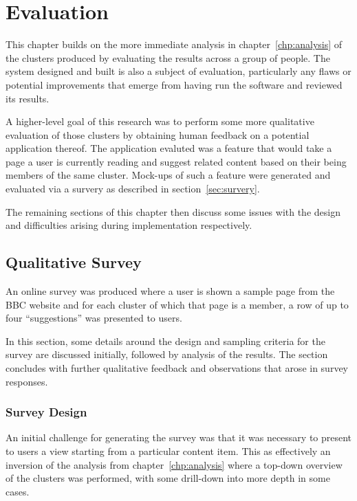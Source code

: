 \chapter{Evaluation}
\label{chp:evaluation}

This chapter builds on the more immediate analysis in
chapter~\ref{chp:analysis} of the clusters produced by evaluating the
results across a group of people. The system designed and built is
also a subject of evaluation, particularly any flaws or potential
improvements that emerge from having run the software and reviewed its
results.

A higher-level
goal of this research was to perform some more qualitative evaluation
of those clusters by obtaining human feedback on a potential
application thereof. The application evaluted was a feature that would
take a page a user is currently reading and suggest related content
based on their being members of the same cluster. Mock-ups of such
a feature were generated and evaluated via a survery as described
in section~\ref{sec:survery}.

The remaining sections of this chapter then discuss some issues with
the design and difficulties arising during implementation
respectively.

\section{Qualitative Survey}
\label{sec:survey}

An online survey was produced where a user is shown a sample page
from the BBC website and for each cluster of which that page is
a member, a row of up to four ``suggestions'' was presented to users.

In this section, some details around the design and sampling criteria
for the survey are discussed initially, followed by analysis of the
results. The section concludes with further qualitative feedback and
observations that arose in survey responses.

\subsection{Survey Design}

An initial challenge for generating the survey was that it was
necessary to present to users a view starting from a particular
content item. This as effectively an inversion of the analysis
from chapter~\ref{chp:analysis} where a top-down overview of the
clusters was performed, with some drill-down into more depth in some
cases.

